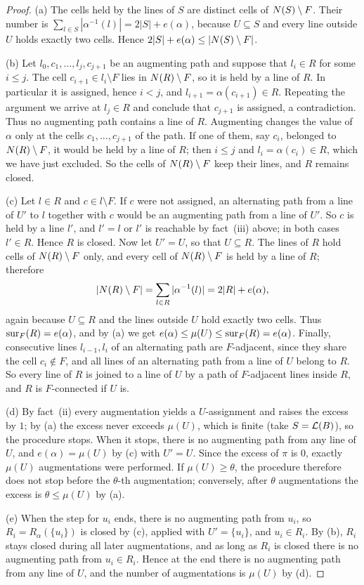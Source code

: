 \begin{proof}
(a) The cells held by the lines of $S$ are distinct cells of $N(S)\setminus F$. Their number is
$\sum_{l\in S}|\alpha^{-1}(l)|=2|S|+e(\alpha)$, because $U\subseteq S$ and every line outside $U$ holds exactly
two cells. Hence $2|S|+e(\alpha)\le|N(S)\setminus F|$.

(b) Let $l_0,c_1,\dots,l_j,c_{j+1}$ be an augmenting path and suppose that $l_i\in R$ for some $i\le j$. The
cell $c_{i+1}\in l_i\setminus F$ lies in $N(R)\setminus F$, so it is held by a line of $R$. In particular
it is assigned, hence $i<j$, and $l_{i+1}=\alpha(c_{i+1})\in R$. Repeating the argument we arrive at
$l_j\in R$ and conclude that $c_{j+1}$ is assigned, a contradiction. Thus no augmenting path contains a
line of $R$. Augmenting changes the value of $\alpha$ only at the cells $c_1,\dots,c_{j+1}$ of the path. If
one of them, say $c_i$, belonged to $N(R)\setminus F$, it would be held by a line of $R$; then $i\le j$
and $l_i=\alpha(c_i)\in R$, which we have just excluded. So the cells of $N(R)\setminus F$ keep their
lines, and $R$ remains closed.

(c) Let $l\in R$ and $c\in l\setminus F$. If $c$ were not assigned, an alternating path from a line of
$U'$ to $l$ together with $c$ would be an augmenting path from a line of $U'$. So $c$ is held by a line
$l'$, and $l'=l$ or $l'$ is reachable by fact~(iii) above; in both cases $l'\in R$. Hence $R$ is closed.
Now let $U'=U$, so that $U\subseteq R$. The lines of $R$ hold cells of $N(R)\setminus F$ only, and every
cell of $N(R)\setminus F$ is held by a line of $R$; therefore
\[
  |N(R)\setminus F|=\sum_{l\in R}|\alpha^{-1}(l)|=2|R|+e(\alpha),
\]
again because $U\subseteq R$ and the lines outside $U$ hold exactly two cells. Thus $\operatorname{sur}_F(R)=e(\alpha)$,
and by (a) we get $e(\alpha)\le\mu(U)\le\operatorname{sur}_F(R)=e(\alpha)$. Finally, consecutive lines $l_{i-1},l_i$ of an
alternating path are $F$-adjacent, since they share the cell $c_i\notin F$, and all lines of an
alternating path from a line of $U$ belong to $R$. So every line of $R$ is joined to a line of $U$ by a
path of $F$-adjacent lines inside $R$, and $R$ is $F$-connected if $U$ is.

(d) By fact~(ii) every augmentation yields a $U$-assignment and raises the excess by $1$; by (a) the
excess never exceeds $\mu(U)$, which is finite (take $S=\mathcal{L}(B)$), so the procedure stops. When it stops,
there is no augmenting path from any line of $U$, and $e(\alpha)=\mu(U)$ by (c) with $U'=U$. Since the
excess of $\pi$ is $0$, exactly $\mu(U)$ augmentations were performed. If $\mu(U)\ge\theta$, the procedure
therefore does not stop before the $\theta$-th augmentation; conversely, after $\theta$ augmentations
the excess is $\theta\le\mu(U)$ by (a).

(e) When the step for $u_i$ ends, there is no augmenting path from $u_i$, so $R_i=R_\alpha(\{u_i\})$ is
closed by (c), applied with $U'=\{u_i\}$, and $u_i\in R_i$. By (b), $R_i$ stays closed during all later
augmentations, and as long as $R_i$ is closed there is no augmenting path from $u_i\in R_i$. Hence at the
end there is no augmenting path from any line of $U$, and the number of augmentations is $\mu(U)$ by (d).
\end{proof}

